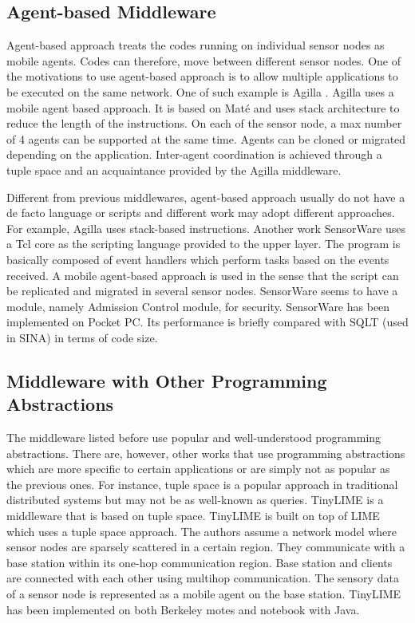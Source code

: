 \subsection{Agent-based Middleware}
Agent-based approach treats the codes running on individual sensor nodes as mobile agents. Codes can therefore, move between different sensor nodes. One of the motivations to use agent-based approach is to allow multiple applications to be executed on the same network. One of such example is Agilla \cite{agilla}. Agilla uses a mobile agent based approach. It is based on Mat\'{e} and uses stack architecture to reduce the length of the instructions. On each of the sensor node, a max number of 4 agents can be supported at the same time. Agents can be cloned or migrated depending on the application. Inter-agent coordination is achieved through a tuple space and an acquaintance provided by the Agilla middleware.

Different from previous middlewares, agent-based approach usually do not have a de facto language or scripts and different work may adopt different approaches. For example, Agilla uses stack-based instructions. Another work SensorWare \cite{sensorware} uses a Tcl core as the scripting language provided to the upper layer. The program is basically composed of event handlers which perform tasks based on the events received. A mobile agent-based approach is used in the sense that the script can be replicated and migrated in several sensor nodes. SensorWare seems to have a module, namely Admission Control module, for security. SensorWare has been implemented on Pocket PC. Its performance is briefly compared with SQLT (used in SINA) in terms of code size.

\subsection{Middleware with Other Programming Abstractions}
The middleware listed before use popular and well-understood programming abstractions. There are, however, other works that use programming abstractions which are more specific to certain applications or are simply not as popular as the previous ones. For instance, tuple space is a popular approach in traditional distributed systems but may not be as well-known as queries. TinyLIME \cite{tinylime} is a middleware that is based on tuple space. TinyLIME is built on top of LIME which uses a tuple space approach. The authors assume a network model where sensor nodes are sparsely scattered in a certain region. They communicate with a base station within its one-hop communication region. Base station and clients are connected with each other using multihop communication. The sensory data of a sensor node is represented as a mobile agent on the base station. TinyLIME has been implemented on both Berkeley motes and notebook with Java.

